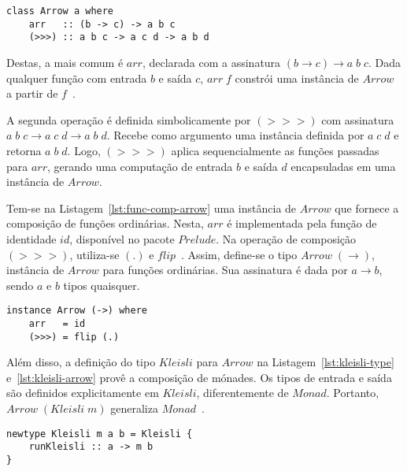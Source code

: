 \documentclass[10pt, conference]{IEEEtran}
\begin{document}
\begin{lstlisting}[caption={Type class $Arrow$~\cite{courtney2001genuinely}}, label={lst:tc-arrow}]
class Arrow a where
	arr   :: (b -> c) -> a b c
	(>>>) :: a b c -> a c d -> a b d
\end{lstlisting}

Destas, a mais comum é $arr$, declarada com a assinatura ${(b \rightarrow c) \rightarrow a\;b\;c}$. Dada qualquer função com entrada $b$ e saída $c$, $arr\;f$ constrói uma instância de $Arrow$ a partir de $f$~\cite{courtney2001genuinely}. 

A segunda operação é definida simbolicamente por $(>>>)$ com assinatura ${a\;b\;c \rightarrow a\;c\;d \rightarrow a\;b\;d}$. Recebe como argumento uma instância definida por ${a\;c\;d}$ e retorna $a\;b\;d$. Logo, $(>>>)$ aplica sequencialmente as funções passadas para $arr$, gerando uma computação de entrada $b$ e saída $d$ encapsuladas em uma instância de $Arrow$.

Tem-se na Listagem~\ref{lst:func-comp-arrow} uma instância de $Arrow$ que fornece a composição de funções ordinárias. Nesta, $arr$ é implementada pela função de identidade $id$, disponível no pacote $Prelude$. Na operação de composição $(>>>)$, utiliza-se $(.)$ e $flip$~\cite{hughes2005programming}. Assim, define-se o tipo ${Arrow\;(\rightarrow)}$,  instância de $Arrow$ para funções ordinárias. Sua assinatura é dada por $a \rightarrow b$, sendo $a$ e $b$ tipos quaisquer.

\begin{lstlisting}[caption={Arrow - Composição de Funções~\cite{hughes2005programming}}, label={lst:func-comp-arrow}]
instance Arrow (->) where
	arr   = id
	(>>>) = flip (.)
\end{lstlisting} 

Além disso, a definição do tipo $Kleisli$ para $Arrow$ na Listagem~\ref{lst:kleisli-type} e~\ref{lst:kleisli-arrow} provê a composição de mónades. Os tipos de entrada e saída são definidos explicitamente em $Kleisli$, diferentemente de $Monad$. Portanto, ${Arrow\;(Kleisli\;m)}$ generaliza $Monad$~\cite{hughes2005programming}.

\noindent\begin{minipage}[b]{\columnwidth}
\begin{lstlisting}[caption={Definição do tipo $Kleisli$~\cite{hughes2005programming}}, label={lst:kleisli-type}]
newtype Kleisli m a b = Kleisli { 
	runKleisli :: a -> m b 
}
\end{lstlisting}
\end{minipage}
\end{document}
